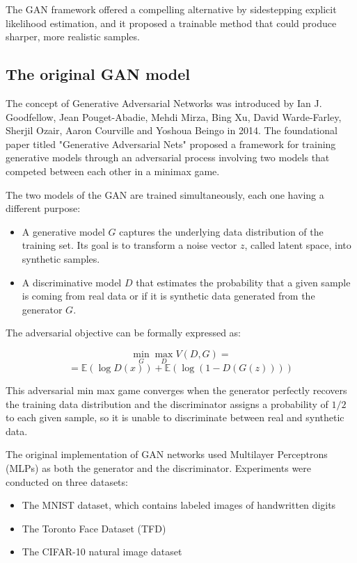 \documentclass[twocolumn]{article}
\begin{document}
The GAN framework offered a compelling alternative by sidestepping explicit likelihood estimation, and
it proposed a trainable method that could produce sharper, more realistic samples.

\subsection{The original GAN model}

The concept of Generative Adversarial Networks was introduced by Ian J. Goodfellow, Jean Pouget-Abadie, Mehdi Mirza,
Bing Xu, David Warde-Farley, Sherjil Ozair, Aaron Courville and Yoshoua Beingo in 2014. The foundational paper titled
"Generative Adversarial Nets" \cite{goodfellow2014generative} proposed a framework for training generative models through an adversarial
process involving two models that competed between each other in a minimax game.

The two models of the GAN are trained simultaneously, each one having a different purpose:
\begin{itemize}
    \item A generative model $G$ captures the underlying data distribution of the training set. Its goal is to transform
        a noise vector $z$, called latent space, into synthetic samples.
    \item A discriminative model $D$ that estimates the probability that a given sample is coming from real data or if it is synthetic
        data generated from the generator $G$.
\end{itemize}

The adversarial objective can be formally expressed as:

$$\min_G \max_D V(D, G) = $$$$ = \mathbb{E}(\log{D(x)}) + \mathbb{E}(\log{(1 - D(G(z)))})$$

This adversarial min max game converges when the generator perfectly recovers the training data distribution
and the discriminator assigns a probability of $1/2$ to each given sample, so it is unable to discriminate between
real and synthetic data.

The original implementation of GAN networks used Multilayer Perceptrons (MLPs) as both the generator and the discriminator.
Experiments were conducted on three datasets:

\begin{itemize}
    \item The MNIST \cite{lecun1998gradient} dataset, which contains labeled images of handwritten digits
    \item The Toronto Face Dataset (TFD) \cite{susskind2010tfd}
    \item The CIFAR-10 natural image dataset \cite{krizhevsky2009learning}
\end{itemize}
\end{document}
